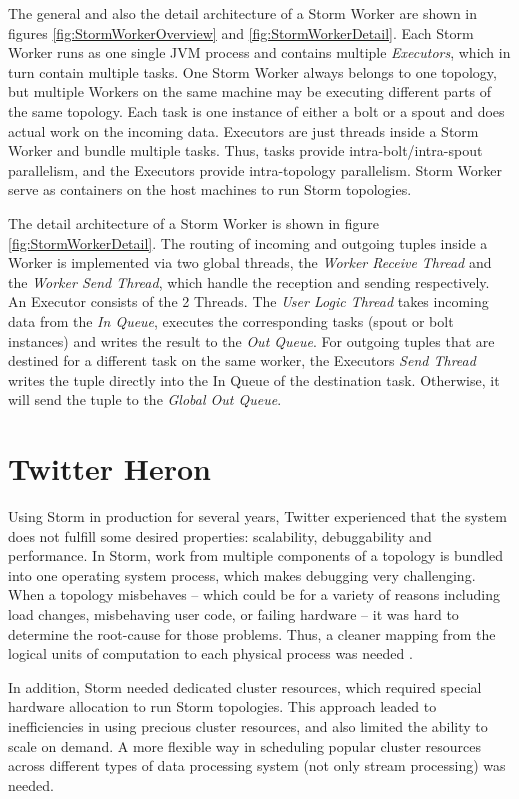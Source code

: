 \documentclass[conference]{IEEEtran}
\begin{document}
The general and also the detail architecture of a Storm Worker are shown in figures \ref{fig:StormWorkerOverview} and \ref{fig:StormWorkerDetail}.
Each Storm Worker runs as one single JVM process and contains multiple \emph{Executors}, which in turn contain multiple tasks.
One Storm Worker always belongs to one topology, but multiple Workers on the same machine may be executing different parts of the same topology.
Each task is one instance of either a bolt or a spout and does actual work on the incoming data.
Executors are just threads inside a Storm Worker and bundle multiple tasks.
Thus, tasks provide intra-bolt/intra-spout parallelism, and the Executors provide intra-topology parallelism.
Storm Worker serve as containers on the host machines to run Storm topologies.

The detail architecture of a Storm Worker is shown in figure \ref{fig:StormWorkerDetail}.
The routing of incoming and outgoing tuples inside a Worker is implemented via two global threads, the \emph{Worker Receive Thread} and the \emph{Worker Send Thread}, which handle the reception and sending respectively.
An Executor consists of the 2 Threads.
The \emph{User Logic Thread} takes incoming data from the \emph{In Queue}, executes the corresponding tasks (spout or bolt instances) and writes the result to the \emph{Out Queue}.
For outgoing tuples that are destined for a different task on the same worker, the Executors \emph{Send Thread} writes the tuple directly into the In Queue of the destination task.
Otherwise, it will send the tuple to the \emph{Global Out Queue}.

\section{Twitter Heron}
\label{sec:TwitterHeron}

Using Storm in production for several years, Twitter experienced that the system does not fulfill some desired properties: scalability, debuggability and performance.
In Storm, work from multiple components of a topology is bundled into one operating system process, which makes debugging very challenging.
When a topology misbehaves – which could be for a variety of reasons including load changes, misbehaving user code, or failing hardware – it was hard to determine the root-cause for those problems.
Thus, a cleaner mapping from the logical units of computation to each physical process was needed \cite{TwitterHeronBlog, TwitterHeron}.

In addition, Storm needed dedicated cluster resources, which required special hardware allocation to run Storm topologies.
This approach leaded to inefficiencies in using precious cluster resources, and also limited the ability to scale on demand.
A more flexible way in scheduling popular cluster resources across different types of data processing system (not only stream processing) was needed.
\end{document}

